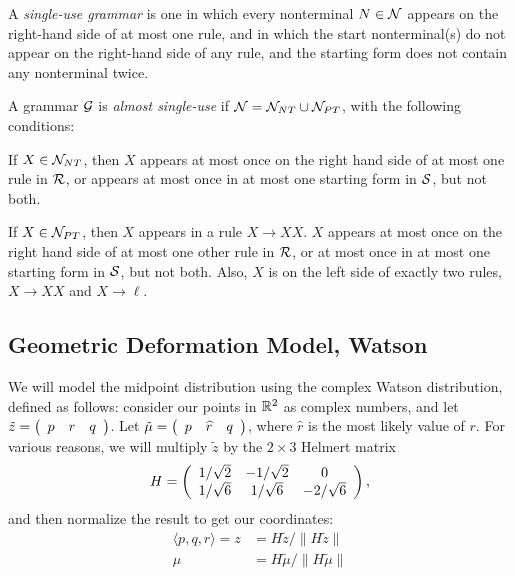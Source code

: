 \documentclass{article}
\begin{document}
\begin{defn}
A {\em single-use grammar} is one in which every nonterminal $N\in
{\mathcal N}$ appears on the right-hand side of at most one rule, and in which
the start nonterminal(s) do not appear on the right-hand side of any rule,
and the starting form does not contain any nonterminal twice.
\end{defn}

\begin{defn}
A grammar ${\mathcal G}$ is {\em almost single-use} if ${\mathcal N} = {\mathcal N}_{NT} \cup
{\mathcal N}_{PT}$, with the following conditions:
\bitem
\item If $X\in {\mathcal N}_{NT}$, then $X$ appears at most once on the right
  hand side of at most one rule in ${\mathcal R}$, or appears at most once in
  at most one starting form in ${\mathcal S}$, but not both.
\item If $X\in {\mathcal N}_{PT}$, then $X$ appears in a rule $X\to XX$. $X$
  appears at most once on the right hand side of at most one other
  rule in ${\mathcal R}$, or at most once in at most one starting form in
  ${\mathcal S}$, but not both. Also, $X$ is on the left side of exactly two
  rules, $X\to XX$ and $X\to \ell$.
\eitem
\end{defn}

\subsection{Geometric Deformation Model, Watson}
 We will model the midpoint distribution
using the complex Watson distribution, defined as follows: consider
our points in $\mathbb{R}^2$ as complex numbers, and let $\tilde{z} =
\left(\begin{array}{c c c} p& r& q\end{array}\right)$.  Let
  $\tilde{\mu} = \left(\begin{array}{c c c} p& \widehat{r} &
    q\end{array}\right)$, where $\widehat{r}$ is the most likely value
    of $r$. For various reasons, we will multiply $\tilde{z}$ by the
    $2\times 3$ Helmert matrix
$$H = \left(\begin{array}{c c c} 1/\sqrt{2} & -1/\sqrt{2} & 0
  \\ 1/\sqrt{6} & 1/\sqrt{6} & -2/\sqrt{6}\end{array}\right), $$ and
then normalize the result to get our coordinates:
\begin{align*}
\langle p, q, r\rangle = z &= H\tilde{z} / \|H\tilde{z}\| \\
\mu &= H\tilde{\mu} / \|H\tilde{\mu}\|
\end{align*}
\end{document}
